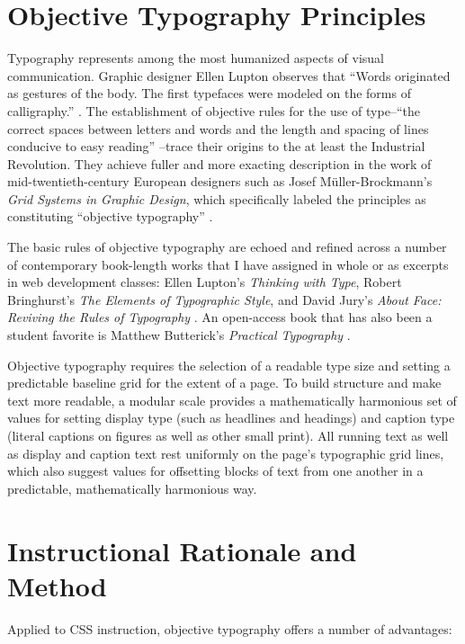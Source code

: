 \documentclass[sigplan,screen]{acmart}
\begin{document}
\section{Objective Typography Principles}

Typography represents among the most humanized aspects of visual communication. Graphic designer Ellen Lupton observes that “Words originated as gestures of the body. The first typefaces were modeled on the forms of calligraphy.” \cite[p.~13]{el:type}. The establishment of objective rules for the use of type--“the correct spaces between letters and words and the length and spacing of lines conducive to easy reading” \cite[p.~19]{mb:grid}--trace their origins to the at least the Industrial Revolution. They achieve fuller and more exacting description in the work of mid-twentieth-century European designers such as Josef Müller-Brockmann’s {\itshape Grid Systems in Graphic Design}, which specifically labeled the principles as constituting “objective typography” \cite[p.~7]{mb:grid}.

The basic rules of objective typography are echoed and refined across a number of contemporary book-length works that I have assigned in whole or as excerpts in web development classes: Ellen Lupton’s {\itshape Thinking with Type}, Robert Bringhurst’s {\itshape The Elements of Typographic Style}, and David Jury’s {\itshape About Face: Reviving the Rules of Typography} \cite{el:type,rb:style,dj:face}. An open-access book that has also been a student favorite is Matthew Butterick’s {\itshape Practical Typography} \cite{mb:pt}.

Objective typography requires the selection of a readable type size and setting a predictable baseline grid for the extent of a page. To build structure and make text more readable, a modular scale provides a mathematically harmonious set of values for setting display type (such as headlines and headings) and caption type (literal captions on figures as well as other small print). All running text as well as display and caption text rest uniformly on the page’s typographic grid lines, which also suggest values for offsetting blocks of text from one another in a predictable, mathematically harmonious way.

\section{Instructional Rationale and Method}

Applied to CSS instruction, objective typography offers a number of advantages:
\end{document}
